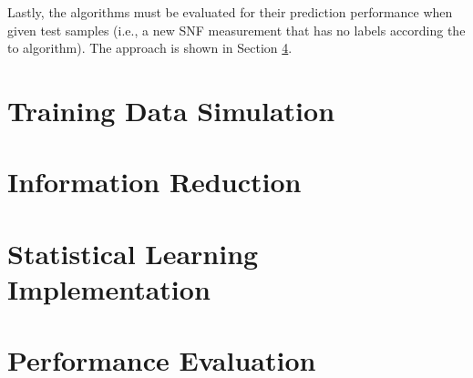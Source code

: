 Lastly, the algorithms must be evaluated for their prediction performance when
given test samples (i.e., a new \gls{SNF} measurement that has no labels
according the to algorithm).  The approach is shown in Section \ref{sec:eval}. 

\section{Training Data Simulation}
\label{sec:training}


\section{Information Reduction}
\label{sec:inforeduc}


\section{Statistical Learning Implementation}
\label{sec:statmodel}


\section{Performance Evaluation}
\label{sec:eval}

